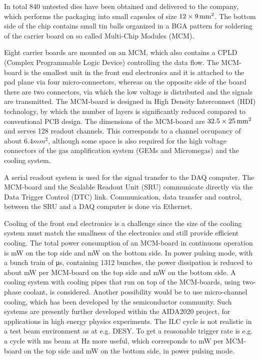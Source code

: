 In total 840 untested dies have been obtained and delivered to the company, which performs the packaging into small capsules of size $12\times\unit[9]{mm^2}$. The bottom side of the chip contains small tin balls organized in a BGA pattern for soldering of the carrier board on so called Multi-Chip Modules (MCM).

Eight carrier boards are mounted on an MCM, which also contains a CPLD (Complex Programmable Logic Device) controlling the data flow. The MCM-board is the smallest unit in the front end electronics and it is attached to the pad plane via four micro-connectors, whereas on the opposite side of the board there are two connectors, via which the low voltage is distributed and the signals are transmitted. The MCM-board is designed in High Density Interconnect (HDI) technology, by which the number of layers is significantly reduced compared to conventional PCB design. The dimensions of the MCM-board are $32.5 \times \unit[25]{mm^2}$ and serves 128 readout channels. This corresponds to a channel occupancy of about $\unit{6.4}{mm^{2}}$, although some space is also required for the high voltage connectors of the gas amplification system (GEMs and Micromegas) and the cooling system.

A serial readout system is used for the signal transfer to the DAQ computer. The MCM-board and the Scalable Readout Unit (SRU) communicate directly via the Data Trigger Control (DTC) link. Communication, data transfer and control, between the SRU and a DAQ computer is done via Ethernet.

Cooling of the front end electronics is a challenge since the size of the cooling system must match the smallness of the electronics and still provide efficient cooling. The total power consumption of an MCM-board in continuous operation
is \unit[3203]{mW} on the top side and \unit[3028]{mW} on the bottom side. In power pulsing mode, with a bunch train of \unit[725]{\micro s}, containing 1312 bunches, the power dissipation is reduced to about \unit[223]{mW} per MCM-board on the top side and \unit[48]{mW} on the bottom side. A cooling system with cooling pipes that run on top of the MCM-boards, using two-phase  coolant, is considered. Another possibility would be to use micro-channel cooling, which has been developed by the semiconductor community. Such systems are presently further developed within the AIDA2020 project, for applications in high energy physics experiments. The ILC cycle is not realistic in a test beam environment as at e.g. DESY. To get a reasonable trigger rate is e.g. a cycle with \unit[5]{ms} beam at \unit[10]{Hz} more useful, which corresponds to \unit[343]{mW} per MCM-board on the top side and \unit[168]{mW} on the bottom side, in power pulsing mode.

